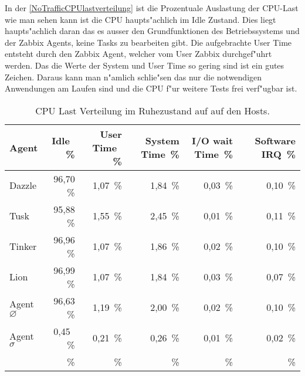 In der \cref{NoTrafficCPUlastverteilung} ist die Prozentuale Auslastung der CPU-Last %
wie man sehen kann ist die CPU haupts"achlich im Idle Zustand. Dies liegt haupts"achlich %
daran das es ausser den Grundfunktionen des Betriebssystems und der Zabbix Agents, keine %
Tasks zu bearbeiten gibt. Die aufgebrachte User Time entsteht durch den Zabbix Agent, %
welcher vom User Zabbix durchgef"uhrt werden. Das die Werte der System und User Time so gering %
sind ist ein gutes Zeichen. Daraus kann man n"amlich schlie"sen das nur die notwendigen %
Anwendungen am Laufen sind und die CPU f"ur weitere Tests frei verf"ugbar ist. %

\begin{table}
\centering
\begin{tabular}{l%
 r<{\,\%}%
 r<{\,\%}%
 r<{\,\%}%
 r<{\,\%}%
 r<{\,\%}%
}
Agent  				& Idle			& User Time		& System Time		& I/O wait Time	& Software IRQ	\\
\hline
Dazzle 				& 96,70			& 1,07			& 1,84	 		& 0,03		& 0,10	\\
Tusk 				& 95,88			& 1,55			& 2,45			& 0,01		& 0,11	\\
Tinker				& 96,96			& 1,07			& 1,86			& 0,02		& 0,10	\\
Lion				& 96,99			& 1,07			& 1,84			& 0,03		& 0,07	\\ 
Agent $\diameter $  		& 96,63			& 1,19			& 2,00			& 0,02	 	& 0,10	\\   
Agent $\sigma $			&  0,45			& 0,21			& 0,26			& 0,01		& 0,02  \\ 

&\end{tabular}
\caption{CPU Last Verteilung im Ruhezustand auf auf den Hosts.}
\label{tab:NoTrafficCPUlastverteilung}
\end{table}































